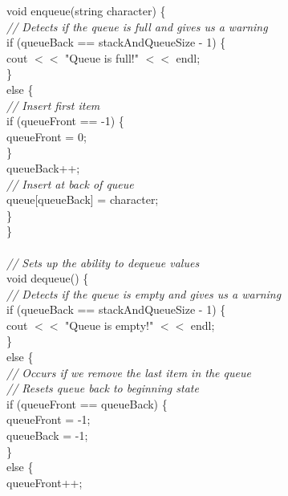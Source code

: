 \documentclass{article}
\begin{document}
\begin {linenumbers}
void enqueue(string character) \{\\
    \textit{// Detects if the queue is full and gives us a warning\\}
    \indent if (queueBack == stackAndQueueSize - 1) \{\\
        \indent \indent cout $<<$ "Queue is full!" $<<$ endl;\\
    \indent \}\\
    \indent else \{\\
        \textit{\indent \indent // Insert first item\\}
        \indent \indent if (queueFront == -1) \{\\
            \indent \indent \indent queueFront = 0;\\
        \indent \indent \}\\
        \indent \indent queueBack++;\\
        \textit{\indent \indent // Insert at back of queue\\}
        \indent \indent queue[queueBack] = character;\\
    \indent \}\\
\}\\
\\
\textit{// Sets up the ability to dequeue values\\}
void dequeue() \{\\
    \textit{// Detects if the queue is empty and gives us a warning\\}
    \indent if (queueBack == stackAndQueueSize - 1) \{\\
        \indent \indent cout $<<$ "Queue is empty!" $<<$ endl;\\
    \indent \}\\
    \indent else \{\\
        \textit{\indent \indent // Occurs if we remove the last item in the queue\\
        \indent \indent // Resets queue back to beginning state\\}
        \indent \indent if (queueFront == queueBack) \{\\
            \indent \indent \indent queueFront = -1;\\
            \indent \indent \indent queueBack = -1;\\
        \indent \indent \}\\
        \indent \indent else \{\\
            \indent \indent \indent queueFront++;\\

\end{linenumbers}
\end{document}
